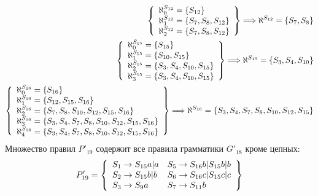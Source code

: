 \begin{itemize}
\begin{align*}
		      \left\{ \begin{array}{l} 
		      \aleph^{S_{12}}_{0}  = \left\{S_{12}\right\}                                             \\
		      \aleph^{S_{12}}_{1}  = \left\{S_7, S_8, S_{12}\right\}                                   \\
		      \aleph^{S_{12}}_{2}  = \left\{S_7, S_8, S_{12}\right\}                                   \\
		       \end{array} \right\}\Longrightarrow {\aleph^{S_{12}}  =  \left\{S_7, S_8\right\} }                                            \\
		      \left\{ \begin{array}{l} 
		      \aleph^{S_{15}}_{0}  = \left\{S_{15}\right\}                                             \\
		      \aleph^{S_{15}}_{1}  = \left\{S_{10}, S_{15}\right\}                                     \\
		      \aleph^{S_{15}}_{2}  = \left\{S_3, S_4, S_{10}, S_{15}\right\}                           \\
		      \aleph^{S_{15}}_{3}  = \left\{S_3, S_4, S_{10}, S_{15}\right\}                           \\
		       \end{array} \right\}\Longrightarrow {\aleph^{S_{15}}  =  \left\{S_3, S_4, S_{10}\right\} }                                    \\
		      \left\{ \begin{array}{l} 
		      \aleph^{S_{16}}_{0}  = \left\{S_{16}\right\}                                             \\
		      \aleph^{S_{16}}_{1}  = \left\{S_{12}, S_{15}, S_{16}\right\}                             \\
		      \aleph^{S_{16}}_{2}  = \left\{S_7, S_8, S_{10}, S_{12}, S_{15}, S_{16}\right\}           \\
		      \aleph^{S_{16}}_{3}  = \left\{S_3, S_4, S_7, S_8, S_{10}, S_{12}, S_{15}, S_{16}\right\} \\
		      \aleph^{S_{16}}_{4}  = \left\{S_3, S_4, S_7, S_8, S_{10}, S_{12}, S_{15}, S_{16}\right\} \\
		       \end{array} \right\}\Longrightarrow {\aleph^{S_{16}}  =  \left\{S_3, S_4, S_7, S_8, S_{10}, S_{12}, S_{15}\right\} }          \\
	      \end{align*}
	      Множество правил \(P'_{19}\) содержит все правила грамматики \(G'_{18}\) кроме цепных:
	      \begin{align*}
		      P'_{19} = \left\{
			      \begin{array}{ll}
				      S_1 \to S_{15}a|a & S_5 \to S_{16}b|S_{15}b|b \\
				      S_2 \to S_{15}b|b & S_6 \to S_{16}c|S_{15}c|c \\
				      S_3 \to S_9a      & S_7 \to S_{11}b           \\

\end{array}\right\}
\end{align*}
\end{itemize}
